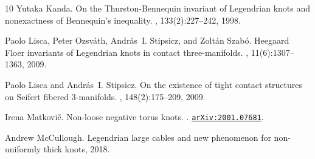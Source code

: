 \documentclass[11pt]{amsart}
\theoremstyle{plain}
\theoremstyle{definition}
\theoremstyle{remark}
\numberwithin{theorem}{section}
\begin{document}
\begin{thebibliography}{10}
Yutaka Kanda.
\newblock On the {T}hurston-{B}ennequin invariant of {L}egendrian knots and
  nonexactness of {B}ennequin's inequality.
, 133(2):227--242, 1998.

Paolo Lisca, Peter Ozsv\'{a}th, Andr\'{a}s~I. Stipsicz, and Zolt\'{a}n
  Szab\'{o}.
\newblock Heegaard {F}loer invariants of {L}egendrian knots in contact
  three-manifolds.
, 11(6):1307--1363, 2009.

Paolo Lisca and Andr{\'a}s~I. Stipsicz.
\newblock On the existence of tight contact structures on {S}eifert fibered
  3-manifolds.
, 148(2):175--209, 2009.

Irena Matkovi{\v c}.
\newblock Non-loose negative torus knots.
.
\newblock \href{https://arxiv.org/abs/2001.07681}{\tt arXiv:2001.07681}.

Andrew McCullough.
\newblock Legendrian large cables and new phenomenon for non-uniformly thick
  knots, 2018.

\end{thebibliography}



%
%
\end{document}
